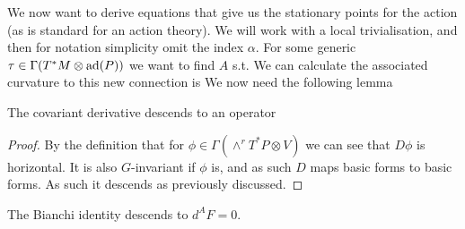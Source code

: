 \documentclass{article}
\begin{document}
We now want to derive equations that give us the stationary points for the action (as is standard for an action theory). We will work with a local trivialisation, and then for notation simplicity omit the index $\alpha$. For some generic $\tau \in \Gamma(T^\ast M \otimes \operatorname{ad}(P))$ we want to find $A$ s.t.  
We can calculate the associated curvature to this new connection is 
We now need the following lemma
\begin{lemma}
	The covariant derivative descends to an operator 
\end{lemma}
\begin{proof}
	By the definition that for $\phi \in \Gamma(\wedge^r T^\ast P \otimes V)$ 
we can see that $D\phi$ is horizontal. It is also $G$-invariant if $\phi$ is, and as such $D$ maps basic forms to basic forms. As such it descends as previously discussed.
\end{proof}

\begin{corollary}
	The Bianchi identity descends to $d^A F = 0$. 
\end{corollary}
\end{document}
